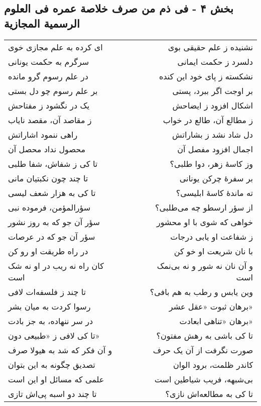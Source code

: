 \begin{center}
\section*{بخش ۴ - فی ذم من صرف خلاصة عمره فی العلوم الرسمیة المجازیة}
\label{sec:004}
\begin{longtable}{l p{0.5cm} r}
ای کرده به علم مجازی خوی
&&
نشنیده ز علم حقیقی بوی
\\
سرگرم به حکمت یونانی
&&
دلسرد ز حکمت ایمانی
\\
در علم رسوم گرو مانده
&&
نشکسته ز پای خود این کنده
\\
بر علم رسوم چو دل بستی
&&
بر اوجت اگر ببرد، پستی
\\
یک در نگشود ز مفتاحش
&&
اشکال افزود ز ایضاحش
\\
ز مقاصد آن، مقصد نایاب
&&
ز مطالع آن، طالع در خواب
\\
راهی ننمود اشاراتش
&&
دل شاد نشد ز بشاراتش
\\
محصول نداد محصل آن
&&
اجمال افزود مفصل آن
\\
تا کی ز شفاش، شفا طلبی
&&
وز کاسهٔ زهر، دوا طلبی؟
\\
تا چند چون نکبتیان مانی
&&
بر سفرهٔ چرکن یونانی
\\
تا کی به هزار شعف لیسی
&&
ته ماندهٔ کاسهٔ ابلیسی؟
\\
سؤرالمؤمن، فرموده نبی
&&
از سؤر ارسطو چه می‌طلبی؟
\\
سؤر آن جو که به روز نشور
&&
خواهی که شوی با او محشور
\\
سؤر آن جو که در عرصات
&&
ز شفاعت او یابی درجات
\\
در راه طریقت او رو کن
&&
با نان شریعت او خو کن
\\
کان راه نه ریب در او نه شک است
&&
و آن نان نه شور و نه بی‌نمک است
\\
تا چند ز فلسفه‌ات لافی
&&
وین یابس و رطب به هم بافی؟
\\
رسوا کردت به میان بشر
&&
برهان ثبوت «عقل عشر»
\\
در سر ننهاده، به جز بادت
&&
برهان «تناهی ابعادت»
\\
تا کی لافی ز «طبیعی دون»
&&
تا کی باشی به رهش مفتون؟
\\
و آن فکر که شد به هیولا صرف
&&
صورت نگرفت از آن یک حرف
\\
تصدیق چگونه به این بتوان
&&
کاندر ظلمت، برود الوان
\\
علمی که مسائل او این است
&&
بی‌شبهه، فریب شیاطین است
\\
تا چند دو اسبه پی‌اش تازی
&&
تا کی به مطالعه‌اش نازی؟

\end{longtable}
\end{center}
